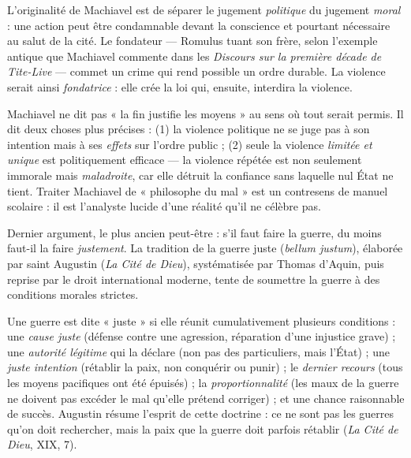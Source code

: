 \documentclass[11pt]{article}
\newcommand{\cle}[1]{{\popxbold\color{popdark}#1}}
\newcounter{popsec}
\newcounter{popsub}
\newcommand{\courssub}[1]{%
  \stepcounter{popsub}%
  \par\vspace{9pt}\noindent{\popxbold\fontsize{11.5}{13}\selectfont\color{popink}{\color{poporange}\thepopsec.\thepopsub}\hspace{6pt}#1}\par\nopagebreak\vspace{4pt}
}
\begin{document}
L'originalité de Machiavel est de séparer le jugement \emph{politique} du jugement \emph{moral} : une action peut être condamnable devant la conscience et pourtant nécessaire au salut de la cité. Le fondateur — Romulus tuant son frère, selon l'exemple antique que Machiavel commente dans les \emph{Discours sur la première décade de Tite-Live} — commet un crime qui rend possible un ordre durable. La violence serait ainsi \emph{fondatrice} : elle crée la loi qui, ensuite, interdira la violence.

\begin{attention}
Machiavel ne dit pas « la fin justifie les moyens » au sens où tout serait permis. Il dit deux choses plus précises : (1) la violence politique ne se juge pas à son intention mais à ses \emph{effets} sur l'ordre public ; (2) seule la violence \emph{limitée et unique} est politiquement efficace — la violence répétée est non seulement immorale mais \emph{maladroite}, car elle détruit la confiance sans laquelle nul État ne tient. Traiter Machiavel de « philosophe du mal » est un contresens de manuel scolaire : il est l'analyste lucide d'une réalité qu'il ne célèbre pas.
\end{attention}

\courssub{La guerre juste : moraliser l'usage des armes}

Dernier argument, le plus ancien peut-être : s'il faut faire la guerre, du moins faut-il la faire \emph{justement}. La tradition de la \cle{guerre juste} (\emph{bellum justum}), élaborée par saint Augustin (\emph{La Cité de Dieu}), systématisée par Thomas d'Aquin, puis reprise par le droit international moderne, tente de soumettre la guerre à des conditions morales strictes.

\begin{definition}
Une guerre est dite « juste » si elle réunit cumulativement plusieurs conditions : une \emph{cause juste} (défense contre une agression, réparation d'une injustice grave) ; une \emph{autorité légitime} qui la déclare (non pas des particuliers, mais l'État) ; une \emph{juste intention} (rétablir la paix, non conquérir ou punir) ; le \emph{dernier recours} (tous les moyens pacifiques ont été épuisés) ; la \emph{proportionnalité} (les maux de la guerre ne doivent pas excéder le mal qu'elle prétend corriger) ; et une chance raisonnable de succès. Augustin résume l'esprit de cette doctrine : ce ne sont pas les guerres qu'on doit rechercher, mais la paix que la guerre doit parfois rétablir (\emph{La Cité de Dieu}, XIX, 7).
\end{definition}
\end{document}
